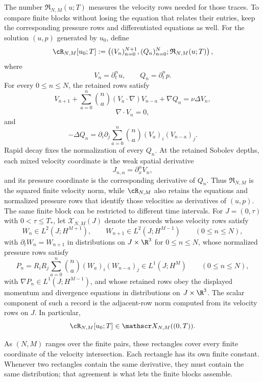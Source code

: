 The number \(\mathfrak R_{N,M}(u;T)\) measures the velocity rows needed for those traces.
To compare finite blocks without losing the equation that relates their entries, keep the corresponding pressure rows and differentiated equations as well.
For the solution \((u,p)\) generated by \(u_0\), define
\[
  \cR_{N,M}[u_0;T]
  :=
  \left(
    (V_n)_{n=0}^{N+1},
    (Q_n)_{n=0}^{N};
    \mathfrak R_{N,M}(u;T)
  \right),
\]
where
\[
  V_n=\partial_t^nu,
  \qquad
  Q_n=\partial_t^np.
\]
For every \(0\le n\le N\), the retained rows satisfy
\[
  V_{n+1}
  +
  \sum_{a=0}^{n}
  \binom{n}{a}
  (V_a\cdot\nabla)V_{n-a}
  +\nabla Q_n
  =
  \nu\Delta V_n,
\]
\[
  \nabla\cdot V_n=0,
\]
and
\[
  -\Delta Q_n
  =
  \partial_i\partial_j
  \sum_{a=0}^{n}
  \binom{n}{a}
  (V_a)_i(V_{n-a})_j.
\]
Rapid decay fixes the normalization of every \(Q_n\).
At the retained Sobolev depths, each mixed velocity coordinate is the weak spatial derivative
\[
  J_{n,\alpha}=\partial_x^\alpha V_n,
\]
and its pressure coordinate is the corresponding derivative of \(Q_n\).
Thus \(\mathfrak R_{N,M}\) is the squared finite velocity norm, while \(\cR_{N,M}\) also retains the equations and normalized pressure rows that identify those velocities as derivatives of \((u,p)\).
The same finite block can be restricted to different time intervals.
For \(J=(0,\tau)\) with \(0<\tau\leq T_*\), let \(\mathscr X_{N,M}(J)\) denote the records whose velocity rows satisfy
\[
  W_n\in L^2(J;H^{M+1}),
  \qquad
  W_{n+1}\in L^2(J;H^{M-1})
  \qquad(0\leq n\leq N),
\]
with \(\partial_tW_n=W_{n+1}\) in distributions on \(J\times\R^3\) for \(0\leq n\leq N\),
whose normalized pressure rows satisfy
\[
  P_n
  =R_iR_j\sum_{a=0}^{n}\binom{n}{a}(W_a)_i(W_{n-a})_j
  \in L^1(J;H^M)
  \qquad(0\leq n\leq N),
\]
with \(\nabla P_n\in L^1(J;H^{M-1})\),
and whose retained rows obey the displayed momentum and divergence equations in distributions on \(J\times\R^3\).
The scalar component of such a record is the adjacent-row norm computed from its velocity rows on \(J\).
In particular,
\[
  \cR_{N,M}[u_0;T]
  \in
  \mathscr X_{N,M}((0,T)).
\]

As \((N,M)\) ranges over the finite pairs, these rectangles cover every finite coordinate of the velocity intersection.
Each rectangle has its own finite constant.
Whenever two rectangles contain the same derivative, they must contain the same distribution; that agreement is what lets the finite blocks assemble.
